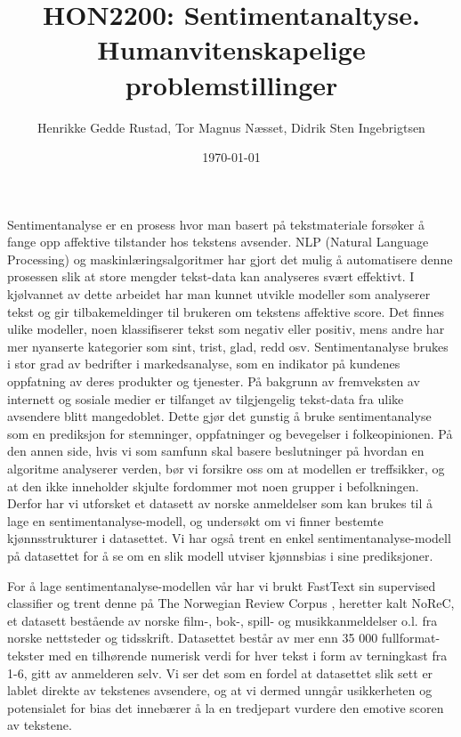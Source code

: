 \documentclass[11pt, a4paper]{article}
\title{HON2200: Sentimentanaltyse. Humanvitenskapelige problemstillinger}
\author{Henrikke Gedde Rustad, Tor Magnus Næsset, Didrik Sten Ingebrigtsen}
\date{\today}
\begin{document}
\maketitle

Sentimentanalyse er en prosess hvor man basert på tekstmateriale forsøker å fange opp affektive tilstander hos tekstens avsender. NLP (Natural Language Processing) og maskinlæringsalgoritmer har gjort det mulig å automatisere denne prosessen slik at store mengder tekst-data kan analyseres svært effektivt. I kjølvannet av dette arbeidet har man kunnet utvikle modeller som analyserer tekst og gir tilbakemeldinger til brukeren om tekstens affektive score. Det finnes ulike modeller, noen klassifiserer tekst som negativ eller positiv, mens andre har mer nyanserte kategorier som sint, trist, glad, redd osv. Sentimentanalyse brukes i stor grad av bedrifter i markedsanalyse, som en indikator på kundenes oppfatning av deres produkter og tjenester. På bakgrunn av fremveksten av internett og sosiale medier er tilfanget av tilgjengelig tekst-data fra ulike avsendere blitt mangedoblet. Dette gjør det gunstig å bruke sentimentanalyse som en prediksjon for stemninger, oppfatninger og bevegelser i folkeopinionen. På den annen side, hvis vi som samfunn skal basere beslutninger på hvordan en algoritme analyserer verden, bør vi forsikre oss om at modellen er treffsikker, og at den ikke inneholder skjulte fordommer mot noen grupper i befolkningen. Derfor har vi utforsket et datasett av norske anmeldelser som kan brukes til å lage en sentimentanalyse-modell, og undersøkt om vi finner bestemte kjønnsstrukturer i datasettet. Vi har også trent en enkel sentimentanalyse-modell på datasettet for å se om en slik modell utviser kjønnsbias i sine prediksjoner.

For å lage sentimentanalyse-modellen vår har vi brukt FastText sin supervised classifier \cite{joulin2017bag} og trent denne på The Norwegian Review Corpus \cite{norec}, heretter kalt NoReC, et datasett bestående av norske film-, bok-, spill- og musikkanmeldelser o.l. fra norske nettsteder og tidsskrift. Datasettet består av mer enn 35 000 fullformat-tekster med en tilhørende numerisk verdi for hver tekst i form av terningkast fra 1-6, gitt av anmelderen selv. Vi ser det som en fordel at datasettet slik sett er lablet direkte av tekstenes avsendere, og at vi dermed unngår usikkerheten og potensialet for bias det innebærer å la en tredjepart vurdere den emotive scoren av tekstene. 
\end{document}
